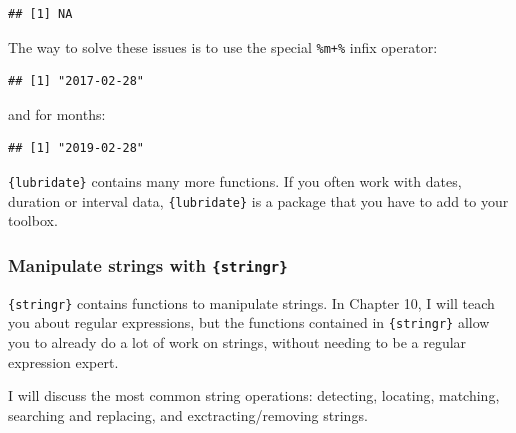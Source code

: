 \documentclass[]{gitbook}
\newenvironment{Shaded}{\begin{snugshade}}{\end{snugshade}}
\newcommand{\DecValTok}[1]{\textcolor[rgb]{0.00,0.00,0.81}{#1}}
\newcommand{\KeywordTok}[1]{\textcolor[rgb]{0.13,0.29,0.53}{\textbf{#1}}}
\newcommand{\NormalTok}[1]{#1}
\newcommand{\OperatorTok}[1]{\textcolor[rgb]{0.81,0.36,0.00}{\textbf{#1}}}
\newcommand{\StringTok}[1]{\textcolor[rgb]{0.31,0.60,0.02}{#1}}
\begin{document}
\begin{verbatim}
## [1] NA
\end{verbatim}

The way to solve these issues is to use the special \texttt{\%m+\%} infix operator:

\begin{Shaded}
\end{Shaded}

\begin{verbatim}
## [1] "2017-02-28"
\end{verbatim}

and for months:

\begin{Shaded}
\end{Shaded}

\begin{verbatim}
## [1] "2019-02-28"
\end{verbatim}

\texttt{\{lubridate\}} contains many more functions. If you often work with dates, duration or interval
data, \texttt{\{lubridate\}} is a package that you have to add to your toolbox.

\hypertarget{manipulate-strings-with-stringr}{%
\subsubsection{\texorpdfstring{Manipulate strings with \texttt{\{stringr\}}}{Manipulate strings with \{stringr\}}}\label{manipulate-strings-with-stringr}}

\texttt{\{stringr\}} contains functions to manipulate strings. In Chapter 10, I will teach you about regular
expressions, but the functions contained in \texttt{\{stringr\}} allow you to already do a lot of work on
strings, without needing to be a regular expression expert.

I will discuss the most common string operations: detecting, locating, matching, searching and
replacing, and exctracting/removing strings.
\end{document}
